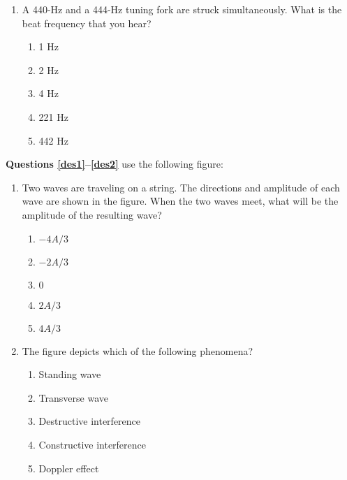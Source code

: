 \documentclass{../../../oss-apphys}
\begin{document}
\begin{multicols}{2}
\begin{enumerate}[leftmargin=18pt]
  \item A 440-Hz and a 444-Hz tuning fork are struck simultaneously. What is
    the beat frequency that you hear?
    \begin{enumerate}[nosep,leftmargin=18pt,label=(\Alph*)]
    \item 1 Hz
    \item 2 Hz
    \item 4 Hz
    \item 221 Hz
    \item 442 Hz
    \end{enumerate}
  \end{enumerate}
  \columnbreak
  
  \textbf{Questions \ref{des1}--\ref{des2}} use the following figure:
  \begin{center}
  \end{center}
  \begin{enumerate}[leftmargin=18pt,resume]
  \item Two waves are traveling on a string. The directions and amplitude of
    each wave are shown in the figure. When the two waves meet, what
    will be the amplitude of the resulting wave?
    \label{des1}
    \begin{enumerate}[nosep,leftmargin=18pt,label=(\Alph*)]
    \item $-4A/3$
    \item $-2A/3$
    \item $0$
    \item $2A/3$
    \item $4A/3$
    \end{enumerate}
    
  \item The figure depicts which of the following phenomena?
    \begin{enumerate}[nosep,leftmargin=18pt,label=(\Alph*)]
    \item Standing wave
    \item Transverse wave
    \item Destructive interference
    \item Constructive interference
    \item Doppler effect
    \end{enumerate}
    \vspace{.7in}
    

\end{enumerate}
\end{multicols}
\end{document}
